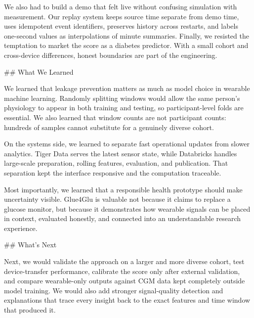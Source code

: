 We also had to build a demo that felt live without confusing simulation with
measurement. Our replay system keeps source time separate from demo time, uses
idempotent event identifiers, preserves history across restarts, and labels
one-second values as interpolations of minute summaries. Finally, we resisted the
temptation to market the score as a diabetes predictor. With a small cohort and
cross-device differences, honest boundaries are part of the engineering.

## What We Learned

We learned that leakage prevention matters as much as model choice in wearable
machine learning. Randomly splitting windows would allow the same person's
physiology to appear in both training and testing, so participant-level folds are
essential. We also learned that window counts are not participant counts: hundreds
of samples cannot substitute for a genuinely diverse cohort.

On the systems side, we learned to separate fast operational updates from slower
analytics. Tiger Data serves the latest sensor state, while Databricks handles
large-scale preparation, rolling features, evaluation, and publication. That
separation kept the interface responsive and the computation traceable.

Most importantly, we learned that a responsible health prototype should make
uncertainty visible. Glue4Glu is valuable not because it claims to replace a
glucose monitor, but because it demonstrates how wearable signals can be placed
in context, evaluated honestly, and connected into an understandable research
experience.

## What's Next

Next, we would validate the approach on a larger and more diverse cohort, test
device-transfer performance, calibrate the score only after external validation,
and compare wearable-only outputs against CGM data kept completely outside model
training. We would also add stronger signal-quality detection and explanations
that trace every insight back to the exact features and time window that produced
it.
